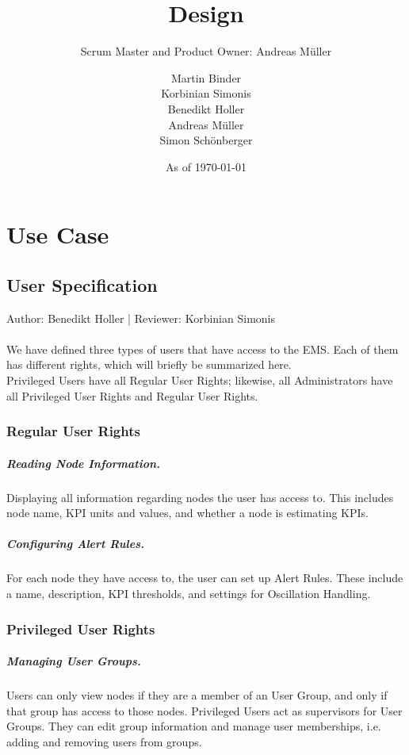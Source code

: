\documentclass{scrreprt}
\title{Design}
\subtitle{Scrum Master and Product Owner: Andreas M\"uller}
\author{Martin Binder\\Korbinian Simonis\\Benedikt Holler\\Andreas M\"uller\\Simon Sch\"onberger}
\date{As of \today}
\begin{document}
\maketitle
\tableofcontents
\chapter{Use Case}
\section{User Specification}
Author: Benedikt Holler | Reviewer: Korbinian Simonis \\ \\
We have defined three types of users that have access to the EMS. Each of them has different rights, which will briefly be summarized here. \\
Privileged Users have all Regular User Rights; likewise, all Administrators have all Privileged User Rights and Regular User Rights. 
\subsection{Regular User Rights}
\paragraph{Reading Node Information.}
Displaying all information regarding nodes the user has access to. This includes node name, KPI units and values, and whether a node is estimating KPIs.
\paragraph{Configuring Alert Rules.} 
For each node they have access to, the user can set up Alert Rules. These include a name, description, KPI thresholds, and settings for Oscillation Handling.
\subsection{Privileged User Rights}
\paragraph{Managing User Groups.}
Users can only view nodes if they are a member of an User Group, and only if that group has access to those nodes. Privileged Users act as supervisors for User Groups. They can edit group information and manage user memberships, i.e. adding and removing users from groups. 
\end{document}
